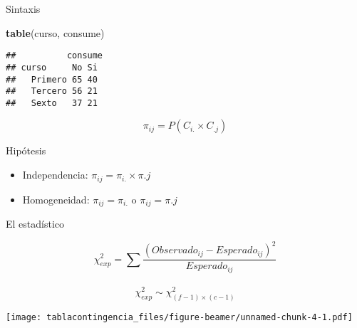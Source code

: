 \documentclass[ignorenonframetext,]{beamer}
\newenvironment{Shaded}{\begin{snugshade}}{\end{snugshade}}
\newcommand{\KeywordTok}[1]{\textcolor[rgb]{0.13,0.29,0.53}{\textbf{#1}}}
\newcommand{\NormalTok}[1]{#1}
\providecommand{\tightlist}{%
  \setlength{\itemsep}{0pt}\setlength{\parskip}{0pt}}
\begin{document}
\begin{frame}[fragile]{Sintaxis}
\protect\hypertarget{sintaxis}{}

\begin{Shaded}
\begin{Highlighting}[]
\KeywordTok{table}\NormalTok{(curso, consume)}
\end{Highlighting}
\end{Shaded}

\end{frame}

\begin{frame}[fragile]

\begin{verbatim}
##          consume
## curso     No Si
##   Primero 65 40
##   Tercero 56 21
##   Sexto   37 21
\end{verbatim}

\end{frame}

\begin{frame}

\[\pi_{ij} = P(C_{i.} \times C_{.j}) \]

\end{frame}

\begin{frame}{Hipótesis}
\protect\hypertarget{hipuxf3tesis}{}

\begin{itemize}
\tightlist
\item
  Independencia: \(\pi_{ij} = \pi_{i.} \times \pi{.j}\)
\item
  Homogeneidad: \(\pi_{ij} = \pi_{i.}\) o \(\pi_{ij} = \pi{.j}\)
\end{itemize}

\end{frame}

\begin{frame}{El estadístico}
\protect\hypertarget{el-estaduxedstico}{}

\[ \chi_{exp}^2 = \sum \frac {(Observado_{ij} - Esperado_{ij})^2} {Esperado_{ij}} \]
~\\
\[ \chi_{exp}^2 \sim \chi_{(f-1) \times (c-1)}^2\]

\end{frame}

\begin{frame}

\texttt{[image: tablacontingencia\_files/figure-beamer/unnamed-chunk-4-1.pdf]}

\end{frame}
\end{document}
